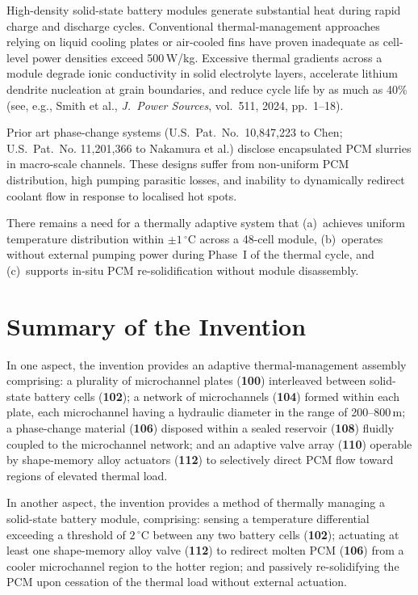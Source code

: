 \documentclass[12pt,letterpaper]{article}
\begin{document}
High-density solid-state battery modules generate substantial heat during rapid charge and
discharge cycles. Conventional thermal-management approaches relying on liquid cooling
plates or air-cooled fins have proven inadequate as cell-level power densities exceed
\mbox{500\,W/kg}. Excessive thermal gradients across a module degrade ionic conductivity in
solid electrolyte layers, accelerate lithium dendrite nucleation at grain boundaries, and
reduce cycle life by as much as 40\% (see, e.g., Smith et al., \textit{J.~Power Sources},
vol.~511, 2024, pp.~1--18).

Prior art phase-change systems (U.S.~Pat.\ No.~10,847,223 to Chen; U.S.~Pat.\ No.
11,201,366 to Nakamura et al.) disclose encapsulated PCM slurries in macro-scale channels.
These designs suffer from non-uniform PCM distribution, high pumping parasitic losses, and
inability to dynamically redirect coolant flow in response to localised hot spots.

There remains a need for a thermally adaptive system that (a)~achieves uniform temperature
distribution within $\pm 1\,^{\circ}\mathrm{C}$ across a 48-cell module, (b)~operates without
external pumping power during Phase~I of the thermal cycle, and (c)~supports in-situ PCM
re-solidification without module disassembly.

\section{Summary of the Invention}

In one aspect, the invention provides an adaptive thermal-management assembly comprising: a
plurality of microchannel plates (\textbf{100}) interleaved between solid-state battery
cells (\textbf{102}); a network of microchannels (\textbf{104}) formed within each plate,
each microchannel having a hydraulic diameter in the range of 200--800\,\textmu m; a
phase-change material (\textbf{106}) disposed within a sealed reservoir (\textbf{108})
fluidly coupled to the microchannel network; and an adaptive valve array (\textbf{110})
operable by shape-memory alloy actuators (\textbf{112}) to selectively direct PCM flow
toward regions of elevated thermal load.

In another aspect, the invention provides a method of thermally managing a solid-state
battery module, comprising: sensing a temperature differential exceeding a threshold of
$2\,^{\circ}\mathrm{C}$ between any two battery cells (\textbf{102}); actuating at least one
shape-memory alloy valve (\textbf{112}) to redirect molten PCM (\textbf{106}) from a cooler
microchannel region to the hotter region; and passively re-solidifying the PCM upon
cessation of the thermal load without external actuation.
\end{document}

